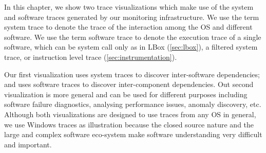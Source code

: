 
In this chapter, we show two trace visualizations which make use
of the system and software traces generated by our monitoring infrastructure.
We use the term system trace to denote the trace of the interaction
among the OS and different software.
We use the term software trace to denote the execution trace of a single
software, which can be system call only as in LBox (\autoref{sec:lbox}),
a filtered system trace, or
instruction level trace (\autoref{sec:instrumentation}).

Our first visualization uses system traces to discover inter-software
dependencies; and uses software traces to
discover inter-component dependencies.
Out second visualization is more general and can be used for different
purposes including software failure diagnostics, analysing performance
issues, anomaly discovery, etc.
Although both visualizations are designed to use traces from any OS in general,
we use Windows traces as illustration because
the closed source nature and the large and complex software eco-system make
software understanding very difficult and important.
